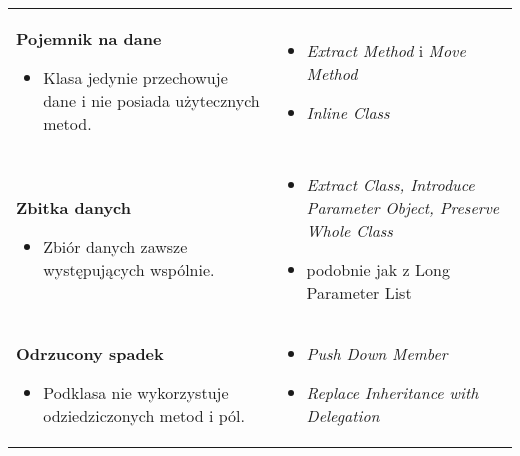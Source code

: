 \documentclass[../main.tex]{subfiles}
\begin{document}
    \begin{table}[H]
        \begin{center}
            \begin{tabular}{ p{.35\linewidth} p{.65\linewidth}}

                \cmidrule(r){1-1}\cmidrule(l){2-2}
                \textbf{Pojemnik na dane}
                \begin{itemize}
                    \item Klasa jedynie przechowuje dane i nie posiada użytecznych metod.
                \end{itemize}
                &
                \begin{itemize}
                    \item \textit{Extract Method} i \textit{Move Method}
                    \item \textit{Inline Class}
                \end{itemize}
                \\

                \cmidrule(r){1-1}\cmidrule(l){2-2}
                \textbf{Zbitka danych}
                \begin{itemize}
                    \item Zbiór danych zawsze występujących wspólnie.
                \end{itemize}
                &
                \begin{itemize}
                    \item \textit{Extract Class, Introduce Parameter Object, Preserve Whole Class}
                    \item podobnie jak z Long Parameter List
                \end{itemize}
                \\

                \cmidrule(r){1-1}\cmidrule(l){2-2}
                \textbf{Odrzucony spadek}
                \begin{itemize}
                    \item Podklasa nie wykorzystuje odziedziczonych metod i pól.
                \end{itemize}
                &
                \begin{itemize}
                    \item \textit{Push Down Member}
                    \item \textit{Replace Inheritance with Delegation}
                \end{itemize}
                \\


\end{tabular}
\end{center}
\end{table}
\end{document}
